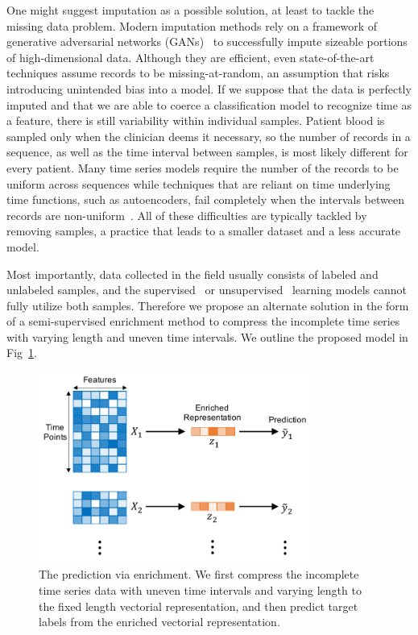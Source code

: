 One might suggest imputation as a possible solution, at least to tackle the missing data problem. Modern imputation methods rely on a framework of generative adversarial networks (GANs)~\cite{yoon2018gain} to successfully impute sizeable portions of high-dimensional data. Although they are efficient, even state-of-the-art techniques assume records to be missing-at-random, an assumption that risks introducing unintended bias into a model. If we suppose that the data is perfectly imputed and that we are able to coerce a classification model to recognize time as a feature, there is still variability within individual samples. Patient blood is sampled only when the clinician deems it necessary, so the number of records in a sequence, as well as the time interval between samples, is most likely different for every patient. Many time series models require the number of the records to be uniform across sequences while techniques that are reliant on time underlying time functions, such as autoencoders, fail completely when the intervals between records are non-uniform~\cite{yu2013embedding}. All of these difficulties are typically tackled by removing samples, a practice that leads to a smaller dataset and a less accurate model. 

Most importantly, data collected in the field usually consists of labeled and unlabeled samples, and the supervised~\cite{yan2020interpretable} or unsupervised~\cite{langkvist2014review,srivastava2015unsupervised} learning models cannot fully utilize both samples. Therefore we propose an alternate solution in the form of a semi-supervised enrichment method to compress the incomplete time series with varying length and uneven time intervals. We outline the proposed model in Fig~\ref{fig: enrichment-learning}. %
\begin{figure}
    \centering
    \includegraphics[width=0.8\textwidth]{figures/enrichment-learning.pdf}
    \caption{The prediction via enrichment. We first compress the incomplete time series data with uneven time intervals and varying length to the fixed length vectorial representation, and then predict target labels from the enriched vectorial representation.} \label{fig: enrichment-learning}
\end{figure}

